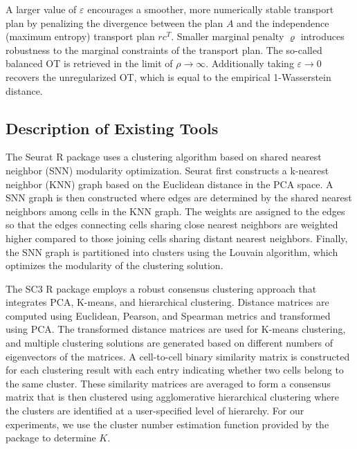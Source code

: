 A larger value of $\varepsilon$ encourages a smoother, more numerically stable transport plan by penalizing the divergence between 
the plan $A$ and the independence (maximum entropy) transport plan $rc^T$. 
Smaller marginal penalty $\varrho$ introduces robustness to the marginal constraints of the transport plan.
The so-called balanced OT is retrieved in the limit of $\rho \to \infty$.
Additionally taking $\varepsilon\to0$ recovers the unregularized OT, which is equal to the
empirical 1-Wasserstein distance. 

\subsection{Description of Existing Tools} \label{sec:existing-tools}

The Seurat R package \citep{seurat} uses a clustering algorithm based on shared nearest neighbor (SNN) modularity optimization.
%
Seurat first constructs a k-nearest neighbor (KNN) graph based on the Euclidean distance in the PCA space. A SNN graph is then constructed where edges are determined by the shared nearest neighbors among cells in the KNN graph.
% 
The weights are assigned to the edges so that the edges connecting cells sharing close nearest neighbors are weighted higher compared to those joining cells sharing distant nearest neighbors.
Finally, the SNN graph is partitioned into clusters using the Louvain algorithm, which optimizes the modularity of the clustering solution.

The SC3 \citep[Single-Cell Consensus Clustering;][]{sc3} R package employs a robust consensus clustering approach that integrates PCA, K-means, and hierarchical clustering.
Distance matrices are computed using Euclidean, Pearson, and Spearman metrics and transformed using PCA. The transformed distance matrices are used for K-means clustering, and multiple clustering solutions are generated based on different numbers of eigenvectors of the matrices. A cell-to-cell binary similarity matrix is constructed for each clustering result with each entry indicating whether two cells belong to the same cluster. These similarity matrices are averaged to form a consensus matrix that is then clustered using agglomerative hierarchical clustering where the clusters are identified at a user-specified level of hierarchy. For our experiments, we use the cluster number estimation function provided by the package to determine $K$.


